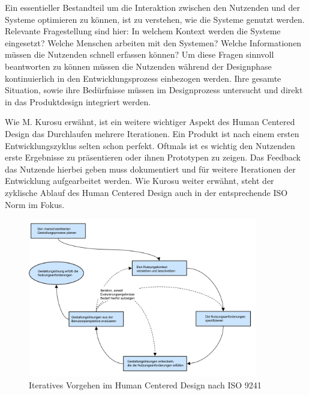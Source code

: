 \documentclass[12pt]{article}
\begin{document}
Ein essentieller Bestandteil um die Interaktion zwischen den Nutzenden und der
Systeme optimieren zu können, ist zu verstehen, wie die Systeme genutzt werden.
Relevante Fragestellung sind hier: In welchem Kontext werden die Systeme
eingesetzt? Welche Menschen arbeiten mit den Systemen? Welche Informationen
müssen die Nutzenden schnell erfassen können? Um diese Fragen sinnvoll
beantworten zu können müssen die Nutzenden während der Designphase
kontinuierlich in den Entwicklungsprozess einbezogen werden. Ihre gesamte
Situation, sowie ihre Bedürfnisse müssen im Designprozess untersucht und direkt
in das Produktdesign integriert werden.\cite{hci}

Wie M. Kurosu erwähnt, ist ein weitere wichtiger Aspekt des Human Centered
Design das Durchlaufen mehrere Iterationen. Ein Produkt ist nach einem ersten
Entwicklungszyklus selten schon perfekt. Oftmals ist es wichtig den Nutzenden
erste Ergebnisse zu präsentieren oder ihnen Prototypen zu zeigen. Das Feedback
das Nutzende hierbei geben muss dokumentiert und für weitere Iterationen der
Entwicklung aufgearbeitet werden. Wie Kurosu weiter erwähnt, steht der
zyklische Ablauf des Human Centered Design auch in der entsprechende ISO Norm
im Fokus.\cite{kurosuHCI}

\begin{figure}[h]
    \caption{Iteratives Vorgehen im Human Centered Design nach ISO 9241 \cite{iso9241}}
    \centering
    \includegraphics[width=10cm]{HCD.png}
\end{figure}
\end{document}
